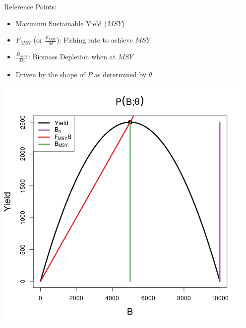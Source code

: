 \documentclass[ xcolor = pdftex, dvipsnames, table ]{beamer}
\begin{document}
%
\begin{frame}
\begin{minipage}[h!]{0.49\textwidth}
	Reference Points:
	\begin{itemize}
	\setlength{\itemsep}{5mm}
	\item Maximum Sustainable Yield ($MSY$)
	\item $F_{MSY}$ (or {\tiny$\frac{F_{MSY}}{M}$}): Fishing rate to achieve $MSY$
	\item $\frac{B_{MSY}}{B_0}$: Biomass Depletion when at $MSY$
	\item Driven by the shape of $P$ as determined by $\theta$.
	\end{itemize}
\end{minipage}
\begin{minipage}[h!]{0.49\textwidth}
	\hspace{0.5cm}
	\includegraphics[width=\textwidth]{../../advance/plots/yieldRPplusP.png}
\end{minipage}
\end{frame}
\end{document}
